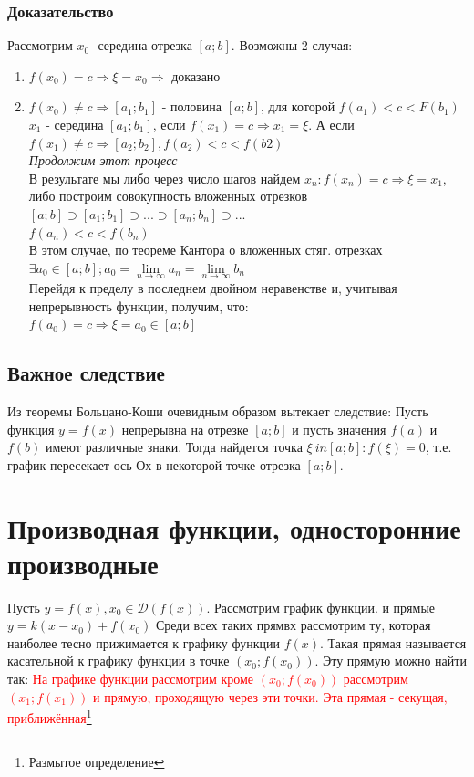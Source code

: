 \documentclass[oneside]{book}
\begin{document}
\begin{enumerate}
\subsection{Доказательство}
Рассмотрим $x_0$ -середина отрезка $[a;b]$. Возможны 2 случая:
\begin{enumerate}
\item $f(x_0)=c \Rightarrow \xi=x_0 \Rightarrow$ доказано
\item $f(x_0)\neq c \Rightarrow [a_1;b_1]$ - половина $[a;b]$, для которой $f(a_1)<c<F(b_1)$
$x_1$ - середина $[a_1;b_1]$, если $f(x_1)=c\Rightarrow x_1=\xi$. А если $f(x_1)\neq c \Rightarrow [a_2; b_2], f(a_2)<c<f(b2)$
\\\textit{Продолжим этот процесс}\\
В результате мы либо через число шагов найдем $x_n:f(x_n)=c\Rightarrow \xi=x_1$, либо построим совокупность вложенных отрезков $[a;b]\supset[a_1;b_1]\supset...\supset[a_n;b_n]\supset...$\\
$f(a_n)<c<f(b_n)$\\
В этом случае, по теореме Кантора о вложенных стяг. отрезках $\exists a_0 \in [a;b]; a_0=\lim \limits_{n \rightarrow \infty}a_n=\lim \limits_{n \rightarrow \infty}b_n$\\
Перейдя к пределу в последнем двойном неравенстве и, учитывая непрерывность функции, получим, что:\\
$f(a_0)=c\Rightarrow \xi=a_0 \in [a;b]$
\end{enumerate}
\section{Важное следствие}
Из теоремы Больцано-Коши очевидным образом вытекает следствие:
Пусть функция $y=f(x)$ непрерывна на отрезке $[a;b]$ и пусть значения $f(a)$ и $f(b)$ имеют различные знаки. Тогда найдется точка $\xi \ in [a;b]: f(\xi)=0$, т.е. график пересекает ось Ох в некоторой точке отрезка $[a;b]$.

\setcounter{chapter}{16}
\chapter{Производная функции, односторонние производные}

Пусть $y = f(x), x_0 \in \mathcal{D}(f(x))$. Рассмотрим график функции. и  прямые $y = k(x - x_0) + f(x_0)$
Среди всех таких прямвх рассмотрим ту, которая наиболее тесно прижимается к графику функции $f(x)$.
Такая прямая называется касательной к графику функции в точке $(x_0; f(x_0))$. Эту прямую можно найти так:
\textcolor{red}{На графике функции рассмотрим кроме $(x_0; f(x_0))$ рассмотрим $(x_1; f(x_1))$ и прямую, проходящую через эти точки. Эта прямая - секущая, приближённая\footnote{Размытое определение}}


\end{enumerate}
\end{document}
